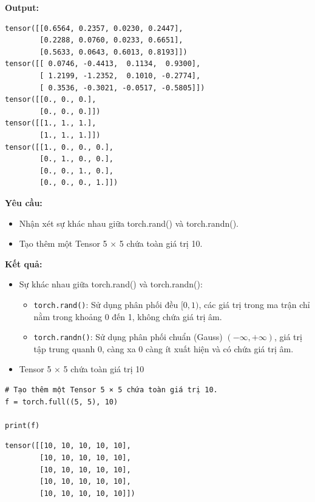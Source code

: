 \documentclass[12pt,a4paper]{article}
\begin{document}
\textbf{Output:}
\begin{verbatim}
tensor([[0.6564, 0.2357, 0.0230, 0.2447],
        [0.2288, 0.0760, 0.0233, 0.6651],
        [0.5633, 0.0643, 0.6013, 0.8193]])
tensor([[ 0.0746, -0.4413,  0.1134,  0.9300],
        [ 1.2199, -1.2352,  0.1010, -0.2774],
        [ 0.3536, -0.3021, -0.0517, -0.5805]])
tensor([[0., 0., 0.],
        [0., 0., 0.]])
tensor([[1., 1., 1.],
        [1., 1., 1.]])
tensor([[1., 0., 0., 0.],
        [0., 1., 0., 0.],
        [0., 0., 1., 0.],
        [0., 0., 0., 1.]])
\end{verbatim}

\textbf{Yêu cầu:}
\begin{itemize}
    \item Nhận xét sự khác nhau giữa torch.rand() và torch.randn().
    \item Tạo thêm một Tensor 5 × 5 chứa toàn giá trị 10.
\end{itemize}

\textbf{Kết quả:}
\begin{itemize}
    \item Sự khác nhau giữa torch.rand() và torch.randn():
    \begin{itemize}
        \item \texttt{torch.rand()}: Sử dụng phân phối đều $[0, 1)$, các giá trị trong ma trận chỉ nằm trong khoảng 0 đến 1, không chứa giá trị âm.
        \item \texttt{torch.randn()}: Sử dụng phân phối chuẩn (Gauss) $(-\infty, +\infty)$, giá trị tập trung quanh 0, càng xa 0 càng ít xuất hiện và có chứa giá trị âm.
    \end{itemize}
    \item Tensor 5 × 5 chứa toàn giá trị 10
\end{itemize}

\begin{verbatim}
# Tạo thêm một Tensor 5 × 5 chứa toàn giá trị 10.
f = torch.full((5, 5), 10)

print(f)
\end{verbatim}


\begin{verbatim}
tensor([[10, 10, 10, 10, 10],
        [10, 10, 10, 10, 10],
        [10, 10, 10, 10, 10],
        [10, 10, 10, 10, 10],
        [10, 10, 10, 10, 10]])
\end{verbatim}
\end{document}
